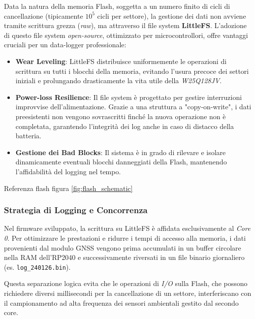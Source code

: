 Data la natura della memoria Flash, soggetta a un numero finito di cicli di cancellazione (tipicamente $10^5$ cicli per settore), la gestione dei dati non avviene tramite scrittura grezza (\textit{raw}), ma attraverso il file system \textbf{LittleFS}. L'adozione di questo file system \textit{open-source}, ottimizzato per microcontrollori, offre vantaggi cruciali per un data-logger professionale:

\begin{itemize}
    \item \textbf{Wear Leveling}: LittleFS distribuisce uniformemente le operazioni di scrittura su tutti i blocchi della memoria, evitando l'usura precoce dei settori iniziali e prolungando drasticamente la vita utile della \textit{W25Q128JV}.
    \item \textbf{Power-loss Resilience}: Il file system è progettato per gestire interruzioni improvvise dell'alimentazione. Grazie a una struttura a "copy-on-write", i dati preesistenti non vengono sovrascritti finché la nuova operazione non è completata, garantendo l'integrità dei log anche in caso di distacco della batteria.
    \item \textbf{Gestione dei Bad Blocks}: Il sistema è in grado di rilevare e isolare dinamicamente eventuali blocchi danneggiati della Flash, mantenendo l'affidabilità del logging nel tempo.
\end{itemize}

Referenza flash figura \ref{fig:flash_schematic}

\subsubsection*{Strategia di Logging e Concorrenza}

Nel firmware sviluppato, la scrittura su LittleFS è affidata esclusivamente al \textit{Core 0}. Per ottimizzare le prestazioni e ridurre i tempi di accesso alla memoria, i dati provenienti dal modulo GNSS \cite{sam_m8q_ds} vengono prima accumulati in un buffer circolare nella RAM dell'RP2040 e successivamente riversati in un file binario giornaliero (es. \texttt{log\_240126.bin}).

Questa separazione logica evita che le operazioni di \textit{I/O} sulla Flash, che possono richiedere diversi millisecondi per la cancellazione di un settore, interferiscano con il campionamento ad alta frequenza dei sensori ambientali gestito dal secondo core.
